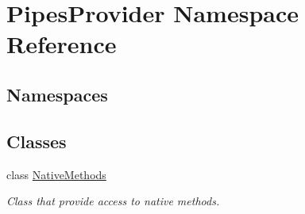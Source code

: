 \hypertarget{namespace_pipes_provider}{}\section{Pipes\+Provider Namespace Reference}
\label{namespace_pipes_provider}
\subsection*{Namespaces}
\begin{DoxyCompactItemize}
\end{DoxyCompactItemize}
\subsection*{Classes}
\begin{DoxyCompactItemize}
\item 
class \mbox{\hyperlink{class_pipes_provider_1_1_native_methods}{Native\+Methods}}
\begin{DoxyCompactList}\small\item\em Class that provide access to native methods. \end{DoxyCompactList}\end{DoxyCompactItemize}
